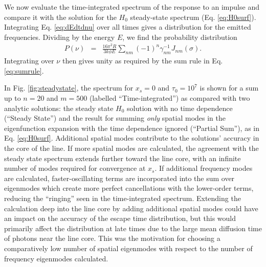 \documentclass{aastex63}
\newcommand{\be}{\begin{eqnarray}}
\newcommand{\ee}{\end{eqnarray}}
\begin{document}
We now evaluate the time-integrated spectrum of the response to an impulse and compare it with the solution for the $H_0$ steady-state spectrum (Eq. \ref{eq:H0surf}). Integrating Eq. \ref{eq:dEdtdnu} over all times gives a distribution for the emitted frequencies. Dividing by the energy $E$, we find the probability distribution
\be \label{eq:spectrum}
P(\nu) & = &  \frac{16\pi^2 R}{3k\phi E}  \sum_{nm} (-1)^n \gamma_{nm}^{-1} J_{nm}(\sigma).
\ee
Integrating over $\nu$ then gives unity as required by the sum rule in Eq. \ref{eq:sumrule}. 

In Fig. \ref{fig:steadystate}, the spectrum for $x_s=0$ and $\tau_0=10^7$ is shown for a sum up to $n=20$ and $m=500$ (labelled ``Time-integrated'') as compared with two analytic solutions: the steady state $H_0$ solution with no time dependence (``Steady State'') and the result for summing \textit{only} spatial modes in the eigenfunction expansion with the time dependence ignored (``Partial Sum''), as in Eq. \ref{eq:H0surf}. Additional spatial modes contribute to the solutions' accuracy in the core of the line. If more spatial modes are calculated, the agreement with the steady state spectrum extends further toward the line core, with an infinite number of modes required for convergence at $x_s$. If additional frequency modes are calculated, faster-oscillating terms are incorporated into the sum over eigenmodes which create more perfect cancellations with the lower-order terms, reducing the ``ringing'' seen in the time-integrated spectrum. Extending the calculation deep into the line core by adding additional spatial modes could have an impact on the accuracy of the escape time distribution, but this would primarily affect the distribution at late times due to the large mean diffusion time of photons near the line core. This was the motivation for choosing a comparatively low number of spatial eigenmodes with respect to the number of frequency eigenmodes calculated. %
\end{document}
